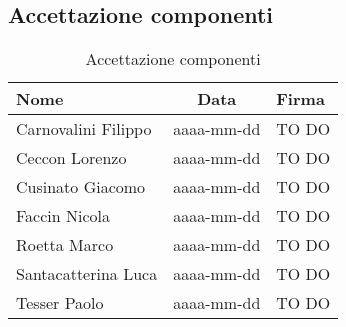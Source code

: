 	\subsection{Accettazione componenti} %
	\label{sub:accettazione_componenti}
		\begin{table}[!h]
			\begin{center}
				\begin{tabularx}{0.8\textwidth}{|p{5cm}|c|X|}
					\hline
					\textbf{Nome} & \textbf{Data} & \textbf{Firma} \\
					\hline
					\rule[-4mm]{0mm}{1cm}
					Carnovalini Filippo &
					aaaa-mm-dd &
					TO DO \\
					\hline
					\rule[-4mm]{0mm}{1cm}
					Ceccon Lorenzo &
					aaaa-mm-dd &
					TO DO \\
					\hline
					\rule[-4mm]{0mm}{1cm}
					Cusinato Giacomo &
					aaaa-mm-dd &
					TO DO \\
					\hline
					\rule[-4mm]{0mm}{1cm}
					Faccin Nicola &
					aaaa-mm-dd &
					TO DO \\
					\hline
					\rule[-4mm]{0mm}{1cm}
					Roetta Marco &
					aaaa-mm-dd &
					TO DO \\
					\hline
					\rule[-4mm]{0mm}{1cm}
					Santacatterina Luca &
					aaaa-mm-dd &
					TO DO \\
					\hline
					\rule[-4mm]{0mm}{1cm}
					Tesser Paolo &
					aaaa-mm-dd &
					TO DO \\
					\hline
				\end{tabularx}
			\end{center}
		\caption{Accettazione componenti}
		\end{table}
	
	\pagebreak
	
